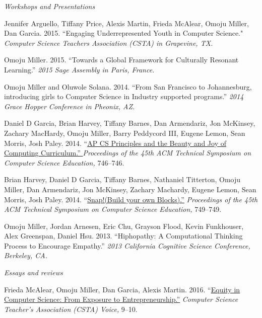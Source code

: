 \documentclass[11pt,article,oneside]{memoir}
\begin{document}
\bigskip

\noindent\emph{Workshops and Presentations  \vspace{0.05in}}


\ind Jennifer Arguello, Tiffany Price, Alexis Martin, Frieda McAlear, Omoju Miller, Dan Garcia. 2015. ``Engaging Underrepresented Youth in Computer Science."  \emph{Computer Science Teachers Association (CSTA) in Grapevine, TX.}

\ind Omoju Miller. 2015. ``Towards a Global Framework for Culturally Resonant Learning.'' \emph{2015 Sage Assembly in Paris, France.} 

\ind Omoju Miller and Oluwole Solana. 2014. ``From San Francisco to Johannesburg, introducing girls to Computer Science in Industry supported programs.'' \emph{2014 Grace Hopper Conference in Pheonix, AZ.}

\ind Daniel D Garcia, Brian Harvey, Tiffany Barnes, Dan Armendariz, Jon McKinsey, Zachary MacHardy, Omoju Miller, Barry Peddycord III, Eugene Lemon, Sean Morris, Josh Paley. 2014. ``\href{http://dl.acm.org/citation.cfm?id=2539026}{AP CS Principles and the Beauty and Joy of Computing Curriculum.'' }\emph{Proceedings of the 45th ACM Technical Symposium on Computer Science Education,} 746--746. 

\ind Brian Harvey, Daniel D Garcia, Tiffany Barnes, Nathaniel Titterton, Omoju Miller, Dan Armendariz, Jon McKinsey, Zachary Machardy, Eugene Lemon, Sean Morris, Josh Paley. 2014. ``\href{http://dl.acm.org/citation.cfm?id=2539022}{Snap!(Build your own Blocks).''} \emph{Proceedings of the 45th ACM Technical Symposium on Computer Science Education,} 749--749. 

\ind Omoju Miller, Jordan Arnesen, Eric Chu, Grayson Flood, Kevin Funkhouser, Alex Greenspan, Daniel Hsu. 2013. ``Hiphopathy: A Computational Thinking Process to Encourage Empathy.'' \emph{2013 California Cognitive Science Conference, Berkeley, CA.} 
 
\bigskip
\noindent\emph{Essays and reviews \vspace{0.05in}}



\ind Frieda McAlear, Omoju Miller, Dan Garcia, Alexis Martin. 2016. ``\href{http://www.csta.acm.org/Communications/sub/CSTAVoice_Files/csta_voice_01_2016.pdf}{Equity in Computer Science: From Exposure to Entrepreneurship.''} \emph{Computer Science Teacher's Association (CSTA) Voice, } 9--10. 
\end{document}
